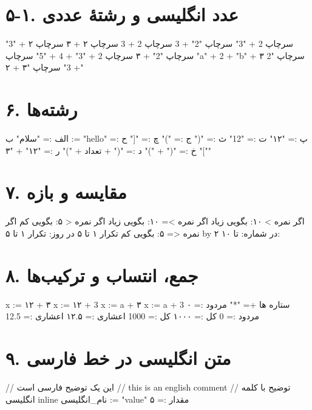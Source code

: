 \documentclass[11pt,openany]{book}
\begin{document}
\section*{۵-۱. عدد انگلیسی و رشتهٔ عددی}
\begin{salamfa}
    سرچاپ 2 + "3"
    سرچاپ "2" + 3
    سرچاپ 2 + 3
    سرچاپ ۲ + ۳
    سرچاپ ۲ + "3"
    سرچاپ "2" + ۳
    سرچاپ 2 + "3" + 4 + "5"
    سرچاپ "a" + 2 + "b" + ۳
    سرچاپ "2 + 3"
    سرچاپ "۳ + ۲"
\end{salamfa}

\section*{۶. رشته‌ها}
\begin{salamfa}
    الف := "سلام"
    ب := "hello"
    پ := "۱۲"
    ت := "12"
    ث := "("
    ج := ")"
    چ := "["
    ح := "]"
    خ := "(" + ")"
    د := "(" + تعداد + ")"
    ر := "۱۲" + "۳"
\end{salamfa}

\section*{۷. مقایسه و بازه}
\begin{salamfa}
    اگر نمره > ۱۰: بگویی زیاد
    اگر نمره >= ۱۰: بگویی زیاد
    اگر نمره < ۵: بگویی کم
    اگر نمره <= ۵: بگویی کم
    تکرار ۱ تا ۵ در روز:
    تکرار ۱ تا ۵ by ۲ در شماره:
    تا ۱۰:
\end{salamfa}

\section*{۸. جمع، انتساب و ترکیب‌ها}
\begin{salamfa}
    x := ۱۲ + ۳
    x := ۱۲ + 3
    x := a + ۳
    x := a + 3
    ستاره ها += "*"
    مردود := ۰
    مردود := 0
    کل := ۱۰۰۰
    کل := 1000
    اعشاری := ۱۲.۵
    اعشاری := 12.5
\end{salamfa}

\section*{۹. متن انگلیسی در خط فارسی}
\begin{salamfa}
    // این یک توضیح فارسی است
    // this is an english comment
    // توضیح با کلمه انگلیسی inline
    نام_انگلیسی := "value"
    مقدار := ۵
\end{salamfa}
\end{document}
